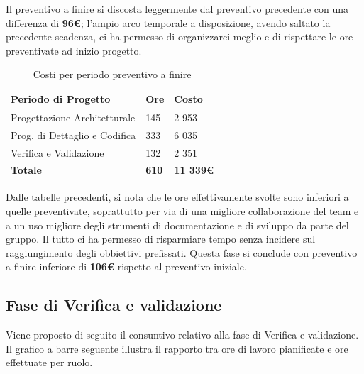 \documentclass[a4paper,11pt]{article}
\begin{document}
		Il preventivo a finire si discosta leggermente dal preventivo precedente con una differenza di \textbf{96\euro}; l'ampio arco temporale a disposizione, avendo saltato la precedente scadenza, ci ha permesso di organizzarci meglio e di rispettare le ore preventivate ad inizio progetto.
		
		\begin{table}[h!]
	\begin{center}
		\begin{tabular}{l l l}
			\textbf{Periodo di Progetto} 	& \textbf{Ore} 	& \textbf{Costo}\\
			\midrule
			Progettazione Architetturale	& 145 			& 2 953 \\
			Prog. di Dettaglio e Codifica 	& 333 			& 6 035 \\
			Verifica e Validazione 			& 132 			& 2 351	\\
			\midrule
			\textbf{Totale} 				&\textbf{610} 	&\textbf{11 339\euro}
		\end{tabular} 
		\end{center}
	\caption{Costi per periodo preventivo a finire}
	\end{table}	
		
		Dalle tabelle precedenti, si nota che le ore effettivamente svolte sono inferiori a quelle preventivate, soprattutto per via di una migliore collaborazione del team e a un uso migliore degli strumenti di documentazione e di sviluppo da parte del gruppo. Il tutto ci ha permesso di risparmiare tempo senza incidere sul raggiungimento degli obbiettivi prefissati. Questa fase si conclude con preventivo a finire inferiore di \textbf{106\euro} rispetto al preventivo iniziale.
	
	
	\newpage
	
		\subsection{Fase di Verifica e validazione}
	Viene proposto di seguito il consuntivo relativo alla fase di Verifica e validazione. Il grafico a barre seguente illustra il rapporto tra ore di lavoro pianificate e ore effettuate per ruolo. 	
	
	
	
\end{document}
